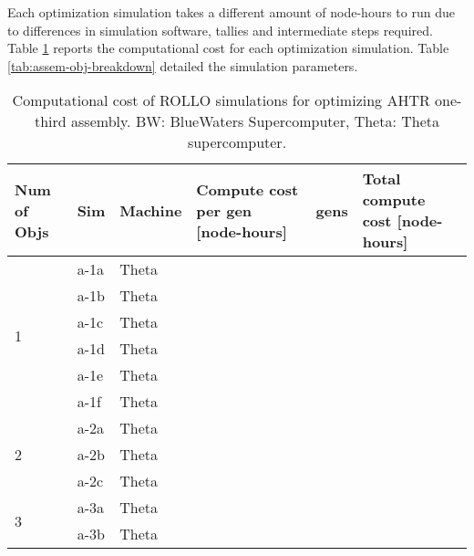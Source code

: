 Each optimization simulation takes a different amount of node-hours to run due to 
differences in simulation software, tallies and intermediate steps required. 
Table \ref{tab:assem-compute-cost} reports the computational cost for each optimization 
simulation. 
Table \ref{tab:assem-obj-breakdown} detailed the simulation parameters.
\begin{table}[htbp!]
    \centering
    \onehalfspacing
    \caption{Computational cost of \acrfull{ROLLO} simulations for optimizing 
    \acrfull{AHTR} one-third assembly. BW: BlueWaters Supercomputer, Theta: Theta 
    supercomputer.}
	\label{tab:assem-compute-cost}
    \footnotesize
    \begin{tabular}{p{1.4cm}|p{1cm}lp{4cm}lp{4cm}}
    \hline 
    \textbf{Num of Objs} & \textbf{Sim} & \textbf{Machine} & 
    \textbf{Compute cost per gen [node-hours]} &\textbf{gens} & 
    \textbf{Total compute cost [node-hours]} \\
    \hline
    \multirow{6}{2cm}{1} 
    & a-1a & Theta &  &  &  \\
    & a-1b & Theta &  &  &  \\
    & a-1c & Theta &  &  &  \\
    & a-1d & Theta &  &  &  \\
    & a-1e & Theta &  &  &  \\
    & a-1f & Theta &  &  &  \\
    \hline
    \multirow{3}{2cm}{2}
    & a-2a & Theta &  &  &  \\
    & a-2b & Theta &  &  &  \\
    & a-2c & Theta &  &  &  \\
    \hline
    \multirow{2}{2cm}{3}
    & a-3a & Theta &  &  &  \\
    & a-3b & Theta &  &  &  \\
    \hline
    \end{tabular}
\end{table}